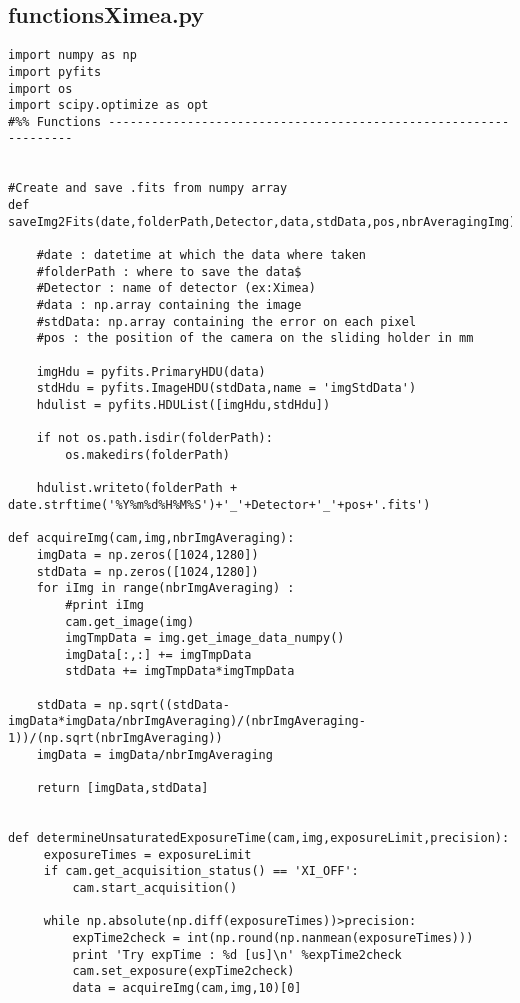 \subsection{functionsXimea.py}
\label{subapp:functionsXimea}

\begin{lstlisting}
import numpy as np
import pyfits
import os
import scipy.optimize as opt
#%% Functions -----------------------------------------------------------------


#Create and save .fits from numpy array
def saveImg2Fits(date,folderPath,Detector,data,stdData,pos,nbrAveragingImg):

    #date : datetime at which the data where taken
    #folderPath : where to save the data$
    #Detector : name of detector (ex:Ximea)
    #data : np.array containing the image
    #stdData: np.array containing the error on each pixel
    #pos : the position of the camera on the sliding holder in mm

    imgHdu = pyfits.PrimaryHDU(data)
    stdHdu = pyfits.ImageHDU(stdData,name = 'imgStdData')
    hdulist = pyfits.HDUList([imgHdu,stdHdu])

    if not os.path.isdir(folderPath):
        os.makedirs(folderPath)

    hdulist.writeto(folderPath + date.strftime('%Y%m%d%H%M%S')+'_'+Detector+'_'+pos+'.fits')

def acquireImg(cam,img,nbrImgAveraging):
    imgData = np.zeros([1024,1280])
    stdData = np.zeros([1024,1280])
    for iImg in range(nbrImgAveraging) :
        #print iImg
        cam.get_image(img)
        imgTmpData = img.get_image_data_numpy()
        imgData[:,:] += imgTmpData
        stdData += imgTmpData*imgTmpData

    stdData = np.sqrt((stdData-imgData*imgData/nbrImgAveraging)/(nbrImgAveraging-1))/(np.sqrt(nbrImgAveraging))
    imgData = imgData/nbrImgAveraging

    return [imgData,stdData]


def determineUnsaturatedExposureTime(cam,img,exposureLimit,precision):
     exposureTimes = exposureLimit
     if cam.get_acquisition_status() == 'XI_OFF':
         cam.start_acquisition()

     while np.absolute(np.diff(exposureTimes))>precision:
         expTime2check = int(np.round(np.nanmean(exposureTimes)))
         print 'Try expTime : %d [us]\n' %expTime2check
         cam.set_exposure(expTime2check)
         data = acquireImg(cam,img,10)[0]


\end{lstlisting}
